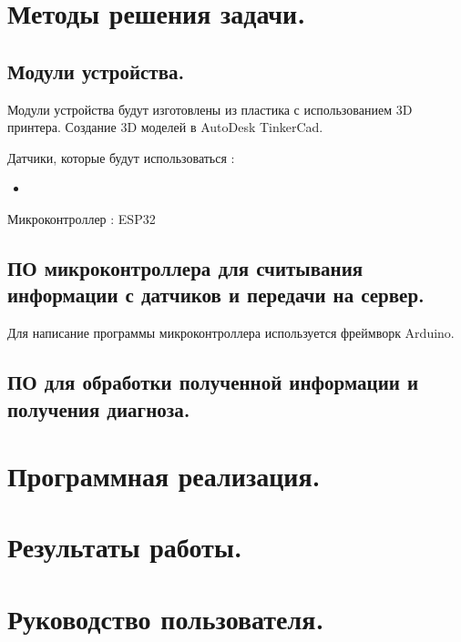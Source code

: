 \documentclass[a4document]{article}
\begin{document}
{
\newpage
\section*{Методы решения задачи.} 

\subsection*{Модули устройства.}
{
Модули устройства будут изготовлены из пластика с использованием 3D принтера.
Создание 3D моделей в AutoDesk TinkerCad.

Датчики, которые будут использоваться : 
\begin{itemize}
    \item 
\end{itemize}

Микроконтроллер : ESP32

}

\subsection*{ПО микроконтроллера для считывания информации с датчиков и передачи на сервер.}
{
Для написание программы микроконтроллера используется фреймворк Arduino.
}

\subsection*{ПО для обработки полученной информации и получения диагноза.}
{}

}

{
\newpage
\section*{Программная реализация.} 
}

{
\newpage
\section*{Результаты работы.} 
}

{
\newpage
\section*{Руководство пользователя.} 
}
\end{document}

